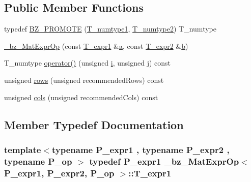 \subsection*{Public Member Functions}
\begin{DoxyCompactItemize}
\item 
typedef \hyperlink{class__bz__MatExprOp_a3b91328a4c7f7762c676e84262e4b4de}{B\+Z\+\_\+\+P\+R\+O\+M\+O\+T\+E} (\hyperlink{class__bz__MatExprOp_a6a6a0f1736a11b0e5df0a11543191e5c}{T\+\_\+numtype1}, \hyperlink{class__bz__MatExprOp_a377d342efc7b8a0f5626a9de9293b2c9}{T\+\_\+numtype2}) T\+\_\+numtype
\item 
\hyperlink{class__bz__MatExprOp_a53bb3f38805592b5671ebd80307e3486}{\+\_\+bz\+\_\+\+Mat\+Expr\+Op} (const \hyperlink{class__bz__MatExprOp_aef37d2e4d98a71279b12b241d8c067a0}{T\+\_\+expr1} \&\hyperlink{gen__mat5files_8m_aae328bf20413f220e38aec4d95bfd6da}{a}, const \hyperlink{class__bz__MatExprOp_ac564f43a14624f056bfc381f36d4e854}{T\+\_\+expr2} \&\hyperlink{gen__mat5files_8m_a7b38767b3b6a8dae167e5afa4fc340b0}{b})
\item 
T\+\_\+numtype \hyperlink{class__bz__MatExprOp_a6a58987c6f7bf8ad030ab35127efcaaa}{operator()} (unsigned \hyperlink{indexexpr_8h_aabd77643995707c185e95c8cb2782c81}{i}, unsigned \hyperlink{indexexpr_8h_aa1f3325d66516548e69238097857fa98}{j}) const 
\item 
unsigned \hyperlink{class__bz__MatExprOp_a9a98dca8dd3ea2ab1091a165d87ae7fb}{rows} (unsigned recommended\+Rows) const 
\item 
unsigned \hyperlink{class__bz__MatExprOp_aaf3c964acd2099f283183e964ce7739f}{cols} (unsigned recommended\+Cols) const 
\end{DoxyCompactItemize}


\subsection{Member Typedef Documentation}
\hypertarget{class__bz__MatExprOp_aef37d2e4d98a71279b12b241d8c067a0}{}
\subsubsection[{T\+\_\+expr1}]{\setlength{\rightskip}{0pt plus 5cm}template$<$typename P\+\_\+expr1 , typename P\+\_\+expr2 , typename P\+\_\+op $>$ typedef P\+\_\+expr1 {\bf \+\_\+bz\+\_\+\+Mat\+Expr\+Op}$<$ P\+\_\+expr1, P\+\_\+expr2, P\+\_\+op $>$\+::{\bf T\+\_\+expr1}}\label{class__bz__MatExprOp_aef37d2e4d98a71279b12b241d8c067a0}
\hypertarget{class__bz__MatExprOp_ac564f43a14624f056bfc381f36d4e854}{}
